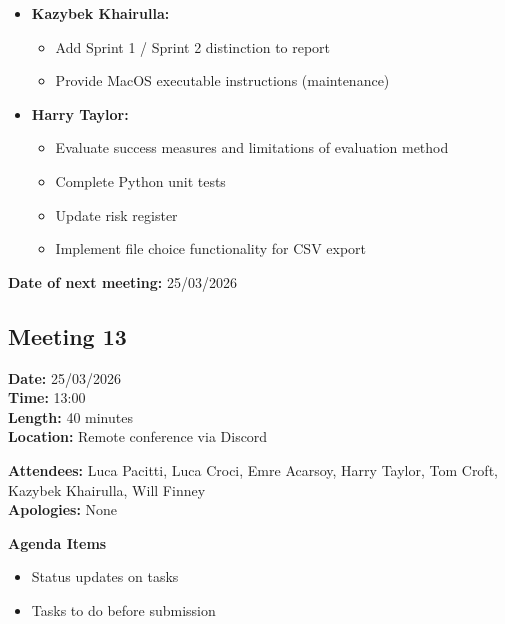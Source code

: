 \documentclass[11pt]{article}
\begin{document}
\begin{itemize}
        \item \textbf{Kazybek Khairulla:}
        \begin{itemize}
            \item Add Sprint 1 / Sprint 2 distinction to report
            \item Provide MacOS executable instructions (maintenance)
        \end{itemize}

        \item \textbf{Harry Taylor:}
        \begin{itemize}
            \item Evaluate success measures and limitations of evaluation method
            \item Complete Python unit tests
            \item Update risk register
            \item Implement file choice functionality for CSV export
        \end{itemize}
    \end{itemize}

    \textbf{Date of next meeting:} 25/03/2026

    \vspace{1.5\baselineskip}
    \subsection{Meeting 13}

    \textbf{Date:} 25/03/2026 \\
    \textbf{Time:} 13:00 \\
    \textbf{Length:} 40 minutes \\
    \textbf{Location:} Remote conference via Discord

    \textbf{Attendees:} Luca Pacitti, Luca Croci, Emre Acarsoy, Harry Taylor, Tom Croft, Kazybek Khairulla, Will Finney \\
    \textbf{Apologies:} None

    \textbf{Agenda Items}
    \begin{itemize}
        \item Status updates on tasks
        \item Tasks to do before submission
    \end{itemize}
\end{document}
